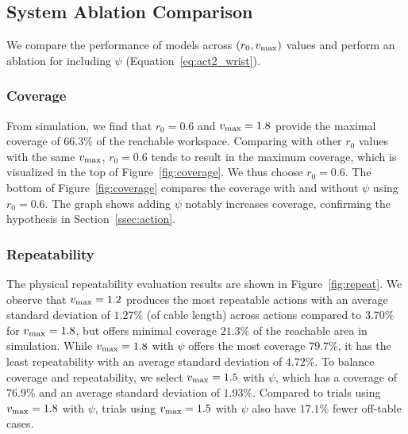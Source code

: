 \documentclass[letterpaper, 10 pt, conference]{ieeeconf}  %
\newcommand{\vmax}{v_{\rm max}}
\begin{document}
\subsection{System Ablation Comparison}
\label{ssec:system-ablation}

We compare the performance of models across $(r_0, \vmax)$ values and perform an ablation for including $\psi$ (Equation~\ref{eq:act2_wrist}).

\subsubsection{Coverage}
From simulation, we find that ${r_0 = 0.6}$ and ${\vmax = 1.8}$ provide the maximal coverage of $66.3\%$ of the reachable workspace. Comparing with other $r_0$ values with the same $\vmax$, $r_0=0.6$ tends to result in the maximum coverage, which is visualized in the top of Figure~\ref{fig:coverage}. We thus choose $r_0=0.6$.
The bottom of Figure~\ref{fig:coverage} compares the coverage with and without $\psi$ using $r_0 = 0.6$. The graph shows adding $\psi$ notably increases coverage, confirming the hypothesis in Section~\ref{ssec:action}. 

\subsubsection{Repeatability}
The physical repeatability evaluation results are shown in Figure~\ref{fig:repeat}. We observe that $\vmax = 1.2$ produces the most repeatable actions with an average standard deviation of $1.27\%$ (of cable length) across actions compared to $3.70\%$ for $\vmax = 1.8$, but offers minimal coverage $21.3\%$ of the reachable area in simulation. While $\vmax=1.8$ with $\psi$ offers the most coverage $79.7\%$, it has the least repeatability with an average standard deviation of $4.72\%$. To balance coverage and repeatability, we select $\vmax=1.5$ with $\psi$, which has a coverage of $76.9\%$ and an average standard deviation of $1.93\%$. Compared to trials using $\vmax=1.8$ with $\psi$, trials using $\vmax = 1.5$ with $\psi$ also have $17.1\%$ fewer off-table cases.
\end{document}
